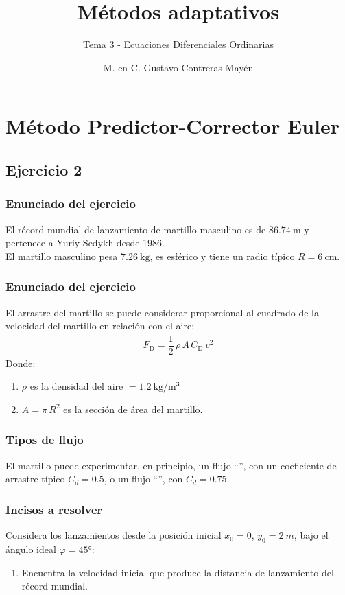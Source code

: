 \documentclass[12pt]{beamer}
\title{\large{Métodos adaptativos}}
\subtitle{Tema 3 - Ecuaciones Diferenciales Ordinarias}
\author{M. en C. Gustavo Contreras Mayén}
\date{}
\begin{document}
\maketitle

\section{Método Predictor-Corrector Euler}
\subsection{Ejercicio 2}

\begin{frame}
\frametitle{Enunciado del ejercicio}
El récord mundial de lanzamiento de martillo masculino es de $\SI{86.74}{\meter}$ y pertenece a Yuriy Sedykh desde 1986.
\\
\bigskip
\pause
El martillo masculino pesa $\SI{7.26}{\kilo\gram}$, es esférico y tiene un radio típico $R = \SI{6}{\centi\meter}$.
\end{frame}
\begin{frame}
\frametitle{Enunciado del ejercicio}
El arrastre del martillo se puede considerar proporcional al cuadrado de la velocidad del martillo en relación con el aire:
\pause
\begin{align*}
F_{\text{D}} = \dfrac{1}{2} \, \rho \, A \, C_{\text{D}} \, v^{2}
\end{align*}
\pause
Donde:
\begin{enumerate}[<+->]
\item $\rho$ es la densidad del aire $= \SI{1.2}{\kilo\gram\per\cubic\meter}$
\item $A = \pi \, R^{2}$ es la sección de área del martillo.
\end{enumerate}
\end{frame}
\begin{frame}
\frametitle{Tipos de flujo}
El martillo puede experimentar, en principio, un flujo \enquote{}, con un coeficiente de arrastre típico $C_{d} = 0.5$, \pause o un flujo \enquote{}, con $C_{d} = 0.75$.
\end{frame}
\begin{frame}
\frametitle{Incisos a resolver}
Considera los lanzamientos desde la posición inicial $x_{0} = 0$, $y_{0} = \SI{2}{m}$, bajo el ángulo ideal $\varphi = \ang{45}$:
\pause
{}
\begin{enumerate}[<+->]
\item Encuentra la velocidad inicial que produce la distancia de lanzamiento del récord mundial.
\seti
\end{enumerate}
\end{frame}
\end{document}
